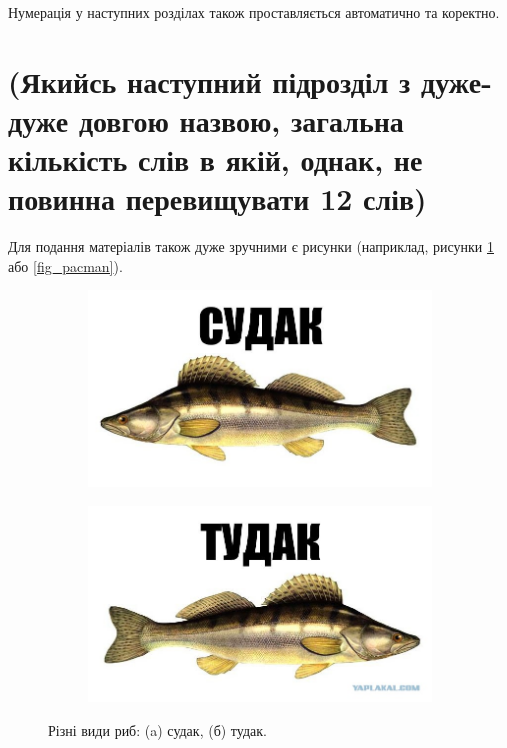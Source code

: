 \begin{theorem}
Нумерація у наступних розділах також проставляється автоматично та коректно.
\end{theorem}

\section{(Якийсь наступний підрозділ з дуже-дуже довгою назвою, загальна кількість слів в якій, однак, не повинна перевищувати 12 слів)}

Для подання матеріалів також дуже зручними є рисунки (наприклад, рисунки 
\ref{fig_sudak} або \ref{fig_pacman}).


\begin{figure}[ht]
\centering
    \begin{subfigure}[b]{0.5\textwidth}    
        \includegraphics[scale=0.3]{Images/Sudak.png}
        \caption{}
    \end{subfigure}%
    \begin{subfigure}[b]{0.5\textwidth}
        \includegraphics[scale=0.3]{Images/Tudak.png}
        \caption{}
    \end{subfigure}
 
    \caption{Різні види риб: (a) судак, (б) тудак.}
    \label{fig_sudak}
\end{figure}

